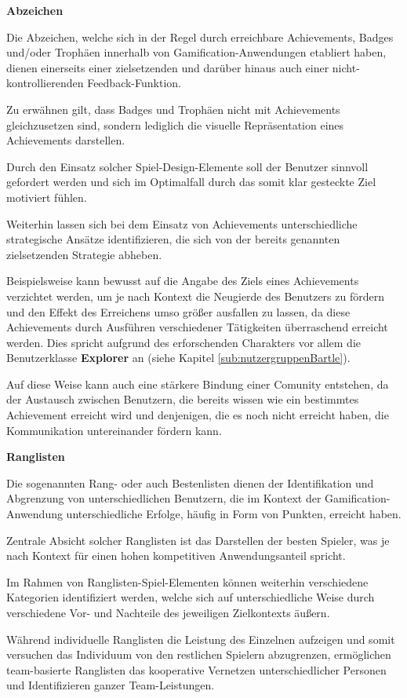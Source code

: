 \documentclass[bibliography=totoc,listof=totoc,BCOR=5mm,DIV=12,oneside]{scrbook}
\begin{document}
\newpage
\par \bigskip \textbf{Abzeichen}
\par Die Abzeichen, welche sich in der Regel durch erreichbare Achievements, Badges und/oder Trophäen innerhalb von Gamification-Anwendungen etabliert haben, dienen einerseits einer zielsetzenden und darüber hinaus auch einer nicht-kontrollierenden Feedback-Funktion. 
\par Zu erwähnen gilt, dass Badges und Trophäen nicht mit Achievements gleichzusetzen sind, sondern lediglich die visuelle Repräsentation eines Achievements darstellen.
\par Durch den Einsatz solcher Spiel-Design-Elemente soll der Benutzer sinnvoll gefordert werden und sich im Optimalfall durch das somit klar gesteckte Ziel motiviert fühlen.
\par \medskip Weiterhin lassen sich bei dem Einsatz von Achievements unterschiedliche strategische Ansätze identifizieren, die sich von der bereits genannten zielsetzenden Strategie abheben. 
\par Beispielsweise kann bewusst auf die Angabe des Ziels eines Achievements verzichtet werden, um je nach Kontext die Neugierde des Benutzers zu fördern und den Effekt des Erreichens umso größer ausfallen zu lassen, da diese Achievements durch Ausführen verschiedener Tätigkeiten überraschend erreicht werden. Dies spricht aufgrund des erforschenden Charakters vor allem die Benutzerklasse \textbf{Explorer} an (siehe Kapitel \ref{sub:nutzergruppenBartle}). 
\par \bigskip Auf diese Weise kann auch eine stärkere Bindung einer Comunity entstehen, da der Austausch zwischen Benutzern, die bereits wissen wie ein bestimmtes Achievement erreicht wird und denjenigen, die es noch nicht erreicht haben, die Kommunikation untereinander fördern kann.

\par \bigskip \textbf{Ranglisten}
\par Die sogenannten Rang- oder auch Bestenlisten dienen der Identifikation und Abgrenzung von unterschiedlichen Benutzern, die im Kontext der Gamification-Anwendung unterschiedliche Erfolge, häufig in Form von Punkten, erreicht haben.
\par Zentrale Absicht solcher Ranglisten ist das Darstellen der besten Spieler, was je nach Kontext für einen hohen kompetitiven Anwendungsanteil spricht.

\par \medskip Im Rahmen von Ranglisten-Spiel-Elementen können weiterhin verschiedene Kategorien identifiziert werden, welche sich auf unterschiedliche Weise durch verschiedene Vor- und Nachteile des jeweiligen Zielkontexts äußern.
\par Während individuelle Ranglisten die Leistung des Einzelnen aufzeigen und somit versuchen das Individuum von den restlichen Spielern abzugrenzen, ermöglichen team-basierte Ranglisten das kooperative Vernetzen unterschiedlicher Personen und Identifizieren ganzer Team-Leistungen.
\end{document}
